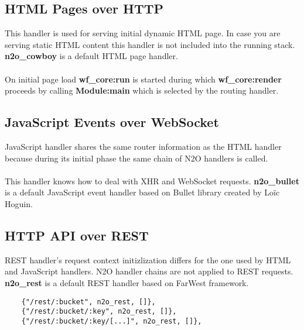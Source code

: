 \subsection{HTML Pages over HTTP}
This handler is used for serving initial dynamic HTML page.
In case you are serving static HTML content this handler is
not included into the running stack. {\bf {n2o}\_{cowboy}} is
a default HTML page handler.

\paragraph{}
On initial page load {\bf {wf}\_{core}:run} is started during
which {\bf {wf}\_{core}:render} proceeds by calling {\bf Module:main} which
is selected by the routing handler.

\subsection{JavaScript Events over WebSocket}
JavaScript handler shares the same router information as the
HTML handler because during its initial phase the same chain
of N2O handlers is called.

\paragraph{}
This handler knows how to deal with XHR and WebSocket requests.
{\bf {n2o}\_{bullet}} is a default JavaScript event handler
based on Bullet library created by Loïc Hoguin.

\newpage
\subsection{HTTP API over REST}
REST handler's request context initizlization differs for the one
used by HTML and JavaScript handlers. N2O handler chains are not
applied to REST requests. {\bf {n2o}\_{rest}} is a default REST
handler based on FarWest framework.

\vspace{1\baselineskip}
\begin{lstlisting}
    {"/rest/:bucket", n2o_rest, []},
    {"/rest/:bucket/:key", n2o_rest, []},
    {"/rest/:bucket/:key/[...]", n2o_rest, []},
\end{lstlisting}

